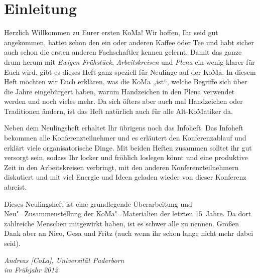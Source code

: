 \chapter{Einleitung}

Herzlich Willkommen zu Eurer ersten KoMa! Wir hoffen, Ihr seid gut angekommen,
hattet schon den ein oder anderen Kaffee oder Tee und habt sicher auch schon
die ersten anderen Fachschaftler kennen gelernt. Damit das ganze drum-herum mit
\emph{Ewigen Frühstück}, \emph{Arbeitskreisen} und \emph{Plena} ein wenig
klarer für Euch wird, gibt es dieses Heft ganz speziell für Neulinge auf der
KoMa. In diesem Heft möchten wir Euch erklären, was die KoMa „ist“, welche
Begriffe sich über die Jahre eingebürgert haben, warum Handzeichen in den Plena
verwendet werden und noch vieles mehr. Da sich öfters aber auch mal Handzeichen
oder Traditionen ändern, ist das Heft natürlich auch für alle Alt-KoMatiker da.

Neben dem Neulingsheft erhaltet Ihr übrigens noch das Infoheft. Das Infoheft
bekommen alle Konferenzteilnehmer und es erläutert den Konferenzablauf und
erklärt viele organisatorische Dinge. Mit beiden Heften zusammen solltet ihr
gut versorgt sein, sodass Ihr locker und fröhlich loslegen könnt und eine
produktive Zeit in den Arbeitskreisen verbringt, mit den anderen
Konferenzteilnehmern diskutiert und mit viel Energie und Ideen geladen wieder
von dieser Konferenz abreist.

Dieses Neulingsheft ist eine grundlegende Überarbeitung und
Neu"=Zusammenstellung der KoMa"=Materialien der letzten 15~Jahre. Da dort
zahlreiche Menschen mitgewirkt haben, ist es schwer alle zu nennen. Großen Dank
aber an Nico, Gesa und Fritz (auch wenn ihr schon lange nicht mehr dabei seid).

\bigskip

\emph{Andreas [CoLa], Universität Paderborn} \\
\emph{im Frühjahr 2012}

